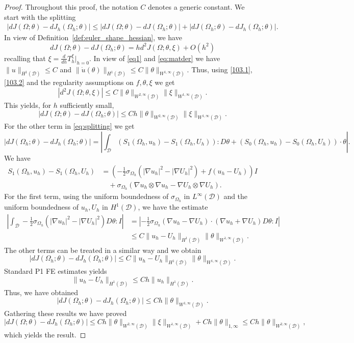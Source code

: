 \documentclass[preprint,9pt]{elsarticle}
\newcommand{\Om}{\Omega}
\newcommand{\ta}{\theta}
\newcommand{\red}{\textcolor{red}}
\begin{document}
\begin{proof}
	Throughout this proof, the notation $C$ denotes a generic constant. 
We start with  the splitting
\begin{align}\label{eq:splitting}
	|dJ(\Om;\ta) - dJ_h(\Om_h;\ta)|	 
\leq  |dJ(\Om;\ta) - dJ(\Om_h;\ta) | +  |dJ(\Om_h;\ta) - dJ_h(\Om_h;\ta)|.
\end{align}
In view of Definition~\ref{def:euler_shape_hessian}, we have 
$$ dJ(\Om;\ta) - dJ(\Om_h;\ta)  = h d^2J(\Om;\ta,\xi) + O(h^2)$$
recalling that $\xi = \frac{d}{dh} T^\xi_h|_{h=0}$.
In view of \eqref{eq1} and \eqref{eq:matder} we have $\|u\|_{H^1(\mathcal{D})}\leq C$
and $\|\dot u(\ta)\|_{H^1(\mathcal{D})} \leq C \|\theta\|_{W^{1,\infty}(\mathcal{D})}$.  
Thus, using \eqref{103.1},\eqref{103.2} and the regularity assumptions on $f,\theta, \xi$ we get
$$ |d^2J(\Om;\ta,\xi)| \leq C \|\ta\|_{W^{2,\infty}(\mathcal{D})} \|\xi\|_{W^{1,\infty}(\mathcal{D})}.$$
This yields, for $h$ sufficiently small,
$$ |dJ(\Om;\ta) - dJ(\Om_h;\ta) | \leq C h \|\ta\|_{W^{2,\infty}(\mathcal{D})} \|\xi\|_{W^{1,\infty}(\mathcal{D})}.$$
For the other term in \eqref{eq:splitting} we get
$$|dJ(\Om_h;\ta) - dJ_h(\Om_h;\ta)|
= \left|\int_\mathcal{D} (S_1(\Om_h,u_h) - S_1(\Om_h,U_h)) : D\ta + (S_0(\Om_h,u_h) - S_0(\Om_h,U_h)) \cdot\ta \right|.$$
We have
\begin{align*} 
S_1(\Om_h,u_h) - S_1(\Om_h,U_h)
& = \left(-\frac{1}{2} \sigma_{\Om_h} (|\nabla u_h|^2 - |\nabla U_h|^2) + f(u_h -U_h)\right) I\\
& \quad  + \sigma_{\Om_h} (\nabla u_h\otimes\nabla u_h -\nabla U_h\otimes\nabla U_h) .
\end{align*}
For the first term, using the uniform boundedness of $\sigma_{\Om_h}$ in $L^\infty(\mathcal{D})$ and the uniform boundedness of $u_h, U_h$ in $H^1(\mathcal{D})$,   we have the estimate
\begin{align*}
	\left|\int_\mathcal{D} -\frac{1}{2} \sigma_{\Om_h} (|\nabla u_h|^2 - |\nabla U_h|^2) D\ta : I \right|
& = \left|-\frac{1}{2} \sigma_{\Om_h} (\nabla u_h - \nabla U_h)\cdot (\nabla u_h + \nabla U_h)D\ta : I\right|\\
 & \leq  C \|u_h - U_h\|_{H^1(\mathcal{D})} \|\ta\|_{W^{1,\infty}(\mathcal{D})}.
\end{align*}
The other terms can be treated in a similar way and we obtain
$$|dJ(\Om_h;\ta) - dJ_h(\Om_h;\ta)|
\leq  C \|u_h - U_h\|_{H^1(\mathcal{D})} \|\ta\|_{W^{1,\infty}(\mathcal{D})} .$$
Standard P1 FE estimates yields 
$$ \|u_h - U_h\|_{H^1(\mathcal{D})} \leq C h\|u_h\|_{H^1(\mathcal{D})}.$$
Thus, we have obtained
$$|dJ(\Om_h;\ta) - dJ_h(\Om_h;\ta)|
\leq  C h \|\ta\|_{W^{1,\infty}(\mathcal{D})} .$$
Gathering these results we have proved
$$|dJ(\Om;\ta) - dJ_h(\Om_h;\ta)| 
\leq   C h \|\ta\|_{W^{2,\infty}(\mathcal{D})} \|\xi\|_{W^{1,\infty}(\mathcal{D})} +  C h \|\ta\|_{1,\infty} \leq  C h \|\ta\|_{W^{2,\infty}(\mathcal{D})},  $$
which yields the result.
\end{proof}
\end{document}
